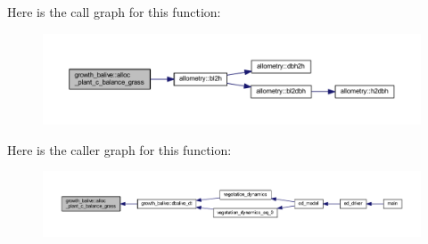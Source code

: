 Here is the call graph for this function\+:\nopagebreak
\begin{figure}[H]
\begin{center}
\leavevmode
\includegraphics[width=350pt]{namespacegrowth__balive_ab77d0ec4f42b787f4ea60352eb81e7ef_cgraph}
\end{center}
\end{figure}




Here is the caller graph for this function\+:\nopagebreak
\begin{figure}[H]
\begin{center}
\leavevmode
\includegraphics[width=350pt]{namespacegrowth__balive_ab77d0ec4f42b787f4ea60352eb81e7ef_icgraph}
\end{center}
\end{figure}


